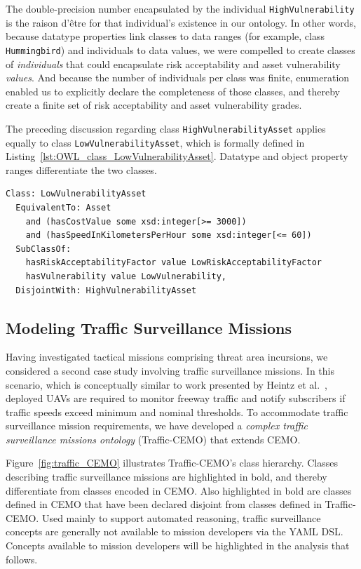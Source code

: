 The double-precision number encapsulated by the individual \texttt{HighVulnerability} is the raison d'\^{e}tre for that individual's existence in our ontology. In other words, because datatype properties link classes to data ranges (for example, class \texttt{Hummingbird}) and individuals to data values, we were compelled to create classes of \emph{individuals} that could encapsulate risk acceptability and asset vulnerability \emph{values}. And because the number of individuals per class was finite, enumeration enabled us to explicitly declare the completeness of those classes, and thereby create a finite set of risk acceptability and asset vulnerability grades.

The preceding discussion regarding class \texttt{HighVulnerabilityAsset} applies equally to class \texttt{LowVulnerabilityAsset}, which is formally defined in Listing~\ref{lst:OWL_class_LowVulnerabilityAsset}. Datatype and object property ranges differentiate the two classes.

\begin{lstlisting}[caption={OWL code for class \texttt{LowVulnerabilityAsset}},label=lst:OWL_class_LowVulnerabilityAsset]
Class: LowVulnerabilityAsset
  EquivalentTo: Asset
    and (hasCostValue some xsd:integer[>= 3000])
    and (hasSpeedInKilometersPerHour some xsd:integer[<= 60])
  SubClassOf:
    hasRiskAcceptabilityFactor value LowRiskAcceptabilityFactor
    hasVulnerability value LowVulnerability,
  DisjointWith: HighVulnerabilityAsset
\end{lstlisting}

\subsection{Modeling Traffic Surveillance Missions}
\label{sec:Modeling_Traffic_Surveillance_Missions}

Having investigated tactical missions comprising threat area incursions, we considered a second case study involving traffic surveillance missions. In this scenario, which is conceptually similar to work presented by Heintz et al.~\cite{Heintz_2007}, deployed UAVs are required to monitor freeway traffic and notify subscribers if traffic speeds exceed minimum and nominal thresholds. To accommodate traffic surveillance mission requirements, we have developed a \emph{complex traffic surveillance missions ontology} (Traffic-CEMO) that extends CEMO\@.

Figure~\ref{fig:traffic_CEMO} illustrates Traffic-CEMO's class hierarchy. Classes describing traffic sur\-veillance missions are highlighted in bold, and thereby differentiate from classes encoded in CEMO\@. Also highlighted in bold are classes defined in CEMO that have been declared disjoint from classes defined in Traffic-CEMO\@. Used mainly to support automated reasoning, traffic surveillance concepts are generally not available to mission developers via the YAML DSL\@. Concepts available to mission developers will be highlighted in the analysis that follows.

